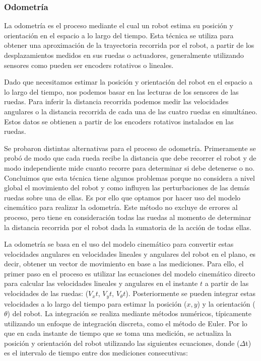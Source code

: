 \subsubsection{Odometría}

La odometría es el proceso mediante el cual un robot estima su posición y orientación en el espacio a lo largo del tiempo. Esta técnica se utiliza para obtener una aproximación de la trayectoria recorrida por el robot, a partir de los desplazamientos medidos en sus ruedas o actuadores, generalmente utilizando sensores como pueden ser encoders rotativos o lineales.

Dado que necesitamos estimar la posición y orientación del robot en el espacio a lo largo del tiempo, nos podemos basar en las lecturas de los sensores de las ruedas. Para inferir la distancia recorrida podemos medir las velocidades angulares o la distancia recorrida de cada una de las cuatro ruedas en simultáneo. Estos datos se obtienen a partir de los encoders rotativos instalados en las ruedas.

Se probaron distintas alternativas para el proceso de odometría. Primeramente se probó de modo que cada rueda recibe la distancia que debe recorrer el robot y de modo independiente mide cuanto recorre para determinar si debe detenerse o no. Concluimos que esta técnica tiene algunos problemas porque no considera a nivel global el movimiento del robot y como influyen las perturbaciones de las demás ruedas sobre una de ellas. Es por ello que optamos por hacer uso del modelo cinemático para realizar la odometría. Este método no excluye de errores al proceso, pero tiene en consideración todas las ruedas al momento de determinar la distancia recorrida por el robot dada la sumatoria de la acción de todas ellas. \cite{palacinodometry}

La odometría se basa en el uso del modelo cinemático para convertir estas velocidades angulares en velocidades lineales y angulares del robot en el plano, es decir, obtener un vector de movimiento en base a las mediciones. Para ello, el primer paso en el proceso es utilizar las ecuaciones del modelo cinemático directo para calcular las velocidades lineales y angulares en el instante $t$ a partir de las velocidades de las ruedas: ($V_xt$, $V_yt$, $V_\theta t$). Posteriormente se pueden integrar estas velocidades a lo largo del tiempo para estimar la posición ($x, y$) y la orientación ($\theta$) del robot. La integración se realiza mediante métodos numéricos, típicamente utilizando un enfoque de integración discreta, como el método de Euler. Por lo que en cada instante de tiempo que se toma una medición, se actualiza la posición y orientación del robot utilizando las siguientes ecuaciones, donde ($\Delta$t) es el intervalo de tiempo entre dos mediciones consecutivas:


